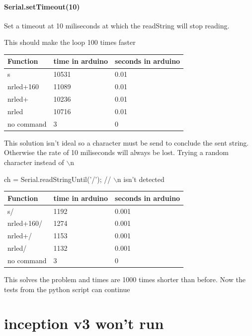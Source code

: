 \documentclass{article}
\begin{document}
\paragraph{Serial.setTimeout(10)}

Set a timeout at 10 miliseconds at which the readString will stop reading. 

This should make the loop 100 times faster



\begin{tabular}{ |l|l|l| }
\hline
 Function & time in arduino & seconds in arduino \tabularnewline
\hline
\hline
 s & 10531 & 0.01 \tabularnewline
\hline
 nrled+160 & 11089 & 0.01 \tabularnewline
\hline
 nrled+ & 10236 & 0.01 \tabularnewline
\hline
 nrled & 10716 & 0.01 \tabularnewline
\hline
 no command & 3 & 0 \tabularnewline
\hline
\end{tabular}






This solution isn't ideal so a character must be send to conclude the sent string. Otherwise the rate of 10 miliseconds will always be lost. Trying a random character instead of $\backslash$n

ch = Serial.readStringUntil('/');  // $\backslash$n isn't detected



\begin{tabular}{ |l|l|l| }
\hline
 Function & time in arduino & seconds in arduino \tabularnewline
\hline
\hline
 s/ & 1192 & 0.001 \tabularnewline
\hline
 nrled+160/ & 1274 & 0.001 \tabularnewline
\hline
 nrled+/ & 1153 & 0.001 \tabularnewline
\hline
 nrled/ & 1132 & 0.001 \tabularnewline
\hline
 no command & 3 & 0 \tabularnewline
\hline
\end{tabular}




This solves the problem and times are 1000 times shorter than before. Now the tests from the python script can continue






















		\section{inception v3 won't run}
\end{document}
